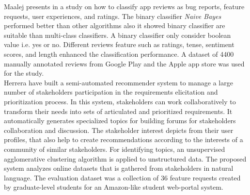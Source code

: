 Maalej presents in \cite{Maalej} a study on how to classify app reviews as bug
reports, feature requests, user experiences, and ratings. The binary classifier
\emph{Naive Bayes} performed better than other algorithms also it showed binary
classifier are suitable than multi-class
classifiers. A binary classifier only consider boolean value i.e. yes or no. Different reviews feature such as ratings,
tense, sentiment scores, and length enhanced the classification performance. A
dataset of 4400 manually annotated reviews from Google Play and the Apple app
store was used for the study.\\

Herrera \etal \cite{Castro-Herrera:2009} have built a semi-automated recommender system to manage a large number of stakeholders participation in
the requirements elicitation and prioritization process. In this system, stakeholders can work collaboratively to transform their needs into sets
of articulated and prioritized requirements. It automatically
generates specialized topics for building forums for stakeholders collaboration and discussion.  The stakeholder interest depicts from their user profiles, that also help to create recommendations according to the
interests of a community of similar stakeholders. For identifying topics, an unsupervised agglomerative clustering algorithm is
applied to unstructured data. The proposed system analyzes online
datasets that is gathered from stakeholders in natural language. 
The evaluation  dataset was a collection of 36 feature requests created by
graduate-level students for an Amazon-like student web-portal system.




